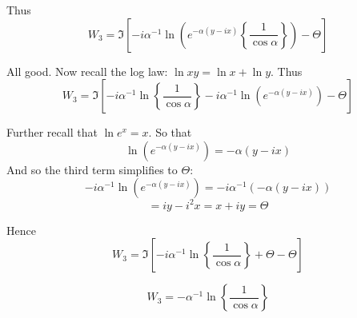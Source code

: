 \documentclass[a4paper]{report}
\begin{document}
Thus
\[ W_{3} = \Im \left[  
 - i \alpha^{-1} \ln \left(
  e^{ - \alpha (y - ix)}  \left\{ \frac{1}{\cos \alpha} \right\} \right) 
  - \Theta  \right] \]
  
All good.  Now recall the log law: $\ln xy = \ln x + \ln y$.  Thus
\[ W_{3} = \Im \left[  
  - i \alpha^{-1} \ln  \left\{ \frac{1}{\cos \alpha} \right\} 
- i \alpha^{-1} \ln \left( e^{ - \alpha (y - ix)} \right) 
  - \Theta  \right] \]

Further recall that $\ln e^{x} = x$. So that
\[ \ln \left( e^{ - \alpha (y - ix)} \right) = - \alpha (y - ix) \]  
And so the third term simplifies to $\Theta$:
\[ - i \alpha^{-1} \ln \left( e^{ - \alpha (y - ix)} \right) 
 = - i \alpha^{-1} (- \alpha (y - ix)) \]
\[ = iy - i^{2}x = x + iy = \Theta \]
  
Hence
  \[ W_{3} = \Im \left[  
  - i \alpha^{-1} \ln  \left\{ \frac{1}{\cos \alpha} \right\} 
 + \Theta 
  - \Theta  \right] \]
  
   \[ W_{3} = - \alpha^{-1} \ln  \left\{ \frac{1}{\cos \alpha} \right\} \]
\end{document}
